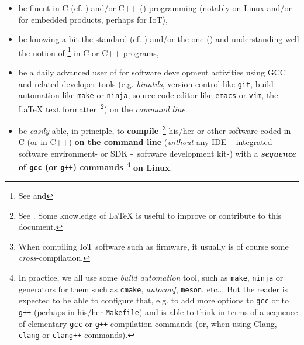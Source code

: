 \begin{itemize}

  \item be fluent in C (cf. \cite{Kernighan:1988:CPL}) and/or C++
    (\cite{Stroustrup:2014:CplusPlus}) programming (notably on Linux
    and/or for embedded products, perhaps for IoT),

  \item be knowing a bit the  standard
    (cf. \cite{C11:std,Memarian:2016:PLDI}) and/or the
     one (\cite{CplusPlus11:std}) and
    understanding well the notion of  \footnote{See
      and } in C or C++
    programs,

  \item be a daily advanced user of  for software
    development activities using GCC and related developer tools
    (e.g. \textit{binutils}, version control like \texttt{git}, build
    automation like \texttt{make} or \texttt{ninja}, source code
    editor like \texttt{emacs} or \texttt{vim}, the {\LaTeX} text
    formatter~\footnote{See
      . Some knowledge of
            {\LaTeX} is useful to improve or contribute to this
            document.}) on the \emph{command line}.
    
    \item be \emph{easily} able, in principle, to
      \textbf{compile}~\footnote{When compiling IoT software such as
        firmware, it usually is of course some
        \emph{cross}-compilation.}  his/her or other software coded in
      C (or in C++) \textbf{on the command line} (\emph{without} any
      IDE
      -~integrated software
      environment- or  SDK
      -~software development kit-)
      with a \textbf{\emph{sequence} of \texttt{gcc} (or \texttt{g++})
        commands}~\footnote{In practice, we all use some \emph{build
          automation} tool, such as \texttt{make}, \texttt{ninja} or
        generators for them such as \texttt{cmake}, \emph{autoconf},
        \texttt{meson}, etc... But the reader is expected to be able
        to configure that, e.g. to add more options to \texttt{gcc} or
        to \texttt{g++} (perhaps in his/her \texttt{Makefile}) and is
        able to think in terms of a sequence of elementary
        \texttt{gcc} or \texttt{g++} compilation commands (or, when
        using Clang, \texttt{clang} or \texttt{clang++} commands).}
      \textbf{on Linux}.




\end{itemize}
